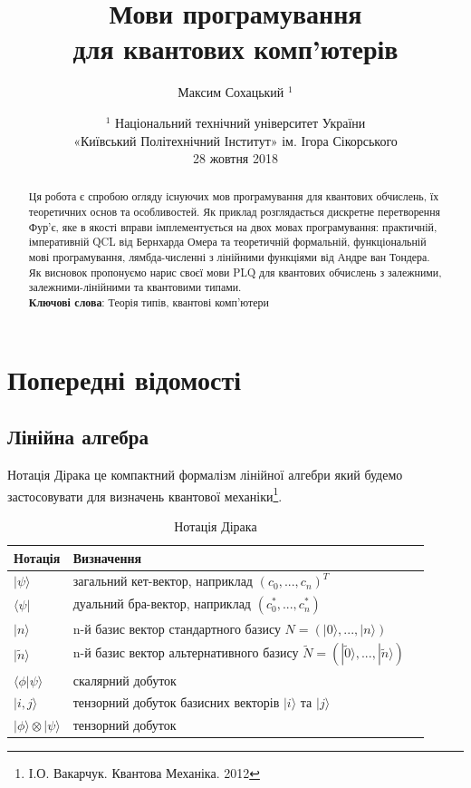 \documentclass{article}
\theoremstyle{definition}
\begin{document}
\title{Мови програмування \\ для квантових комп'ютерів}
\author{Максим Сохацький $^1$}
\date{ \small $^1$ Національний технічний університет України \\
       «Київський Політехнічний Інститут» ім. Ігора Сікорського \\
       28 жовтня 2018 }
\maketitle

\begin{abstract}
Ця робота є спробою огляду існуючих мов програмування для квантових обчислень,
їх теоретичних основ та особливостей.
Як приклад розглядається дискретне перетворення Фур'є,
яке в якості вправи імплементується на двох мовах програмування:
практичній, імперативній QCL від Бернхарда Омера\cite{Omer2003} та
теоретичній формальній, функціональній мові програмування, лямбда-численні
з лінійними функціями від Андре ван Тондера\cite{Tonder2004}. Як висновок
пропонуємо нарис своєї мови PLQ для квантових обчислень з залежними,
залежними-лінійними та квантовими типами.
\\
{\bf Ключові слова}: Теорія типів, квантові комп'ютери
\end{abstract}
\tableofcontents

\newpage

\section{Попередні відомості}

\subsection{Лінійна алгебра}
Нотація Дірака це компактний формалізм лінійної алгебри який будемо застосовувати
для визначень квантової механіки\footnote{І.О. Вакарчук. Квантова Механіка. 2012}.

\begin{table}[h]
\centering
  \caption{Нотація Дірака}
 \begin{tabular}{lll}
    \hline
       Нотація & Визначення \\
    \hline
       $|\psi\rangle$ & загальний кет-вектор, наприклад $(c_0,...,c_n)^T$ \\
       $\langle\psi|$ & дуальний бра-вектор, наприклад $(c_0^*,...,c_n^*)$ \\
       $|n\rangle$ & n-й базис вектор стандартного базису $N=(|0\rangle,...,|n\rangle)$\\
       $|\tilde{n}\rangle$ & n-й базис вектор альтернативного базису $\tilde{N}=(|\tilde{0}\rangle,...,|\tilde{n}\rangle)$ \\
       $\langle\phi|\psi\rangle$ & скалярний добуток \\
       $|i,j\rangle$ & тензорний добуток базисних векторів $|i\rangle$ та $|j\rangle$ \\
       $|\phi\rangle\otimes|\psi\rangle$ & тензорний добуток \\
    \hline
  \end{tabular}
\end{table}
\end{document}
